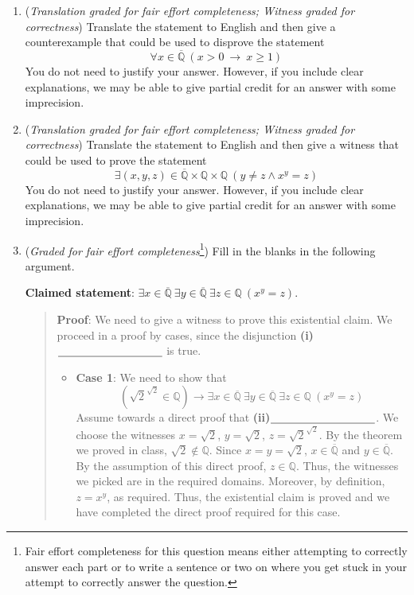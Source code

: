 \documentclass[12pt, oneside]{article}
\begin{document}
\begin{enumerate}
\begin{enumerate}
        \item ({\it Translation graded for fair effort completeness; Witness graded 
        for correctness}) Translate the statement to English and then give a counterexample 
        that could be used to disprove the statement
        \[
        \forall x \in \overline{\mathbb{Q}} ~\left(  x > 0 ~\to~ x \geq 1 \right)
        \]
        You do not need to justify your answer.  However, if you include clear explanations, 
        we may be able to give partial credit for an answer with some imprecision.
   
        \item ({\it Translation graded for fair effort completeness; Witness graded 
        for correctness}) Translate the statement to English and then give a witness that 
        could be used to prove the statement 
        \[
        \exists (x,y,z) \in \overline{\mathbb{Q}}\times\mathbb{Q}\times \mathbb{Q} ~(y \neq z \land x^ y= z)
        \]
        You do not need to justify your answer.  However, if you include clear explanations, 
        we may be able to give partial credit for an answer with some imprecision.
   
        \item ({\it Graded for fair effort completeness}\footnote{Fair effort completeness
        for this question means either attempting to correctly answer each part
        or to write a sentence or two on where you get stuck in your attempt to correctly answer
        the question.}) Fill in the blanks in the following argument.

        {\bf Claimed statement}: 
        $\exists x \in \overline{\mathbb{Q}}~ \exists y \in \overline{\mathbb{Q}} 
        ~\exists z\in \mathbb{Q} ~(x^y = z)$.
        
        \begin{quote}
        {\bf Proof}: We need to give a witness to prove this existential claim. 
        We proceed in a proof by cases, since the disjunction
        \textbf{(i)}$\underline{\phantom{\hspace{1.3in}}}$ is true.
        \begin{itemize}
        \item {\bf Case 1}: We need to show that 
        \[
            (\sqrt{2}^{\sqrt{2}} \in \mathbb{Q}) \to 
            \exists x \in \overline{\mathbb{Q}}~ \exists y \in \overline{\mathbb{Q}} 
            ~\exists z\in \mathbb{Q} ~(x^y = z)
        \]
        Assume towards a direct proof that \textbf{(ii)}$\underline{\phantom{\hspace{1.3in}}}$. We
        choose the witnesses $x = \sqrt{2}$, $y = \sqrt{2}$, $z = \sqrt{2}^{\sqrt{2}}$.  By the 
        theorem we proved in class, $\sqrt{2} \notin \mathbb{Q}$.
        Since $x = y = \sqrt{2}$, $x \in \overline{\mathbb{Q}}$ and  $y \in \overline{\mathbb{Q}}$.
        By the assumption of this direct proof, $z \in \mathbb{Q}$. Thus, the witnesses we picked
        are in the required domains.  Moreover, by definition, $z = x^y$, as required. Thus, the existential claim
        is proved and we have completed the direct proof required for this case.
   

\end{itemize}
\end{quote}
\end{enumerate}
\end{enumerate}
\end{document}
